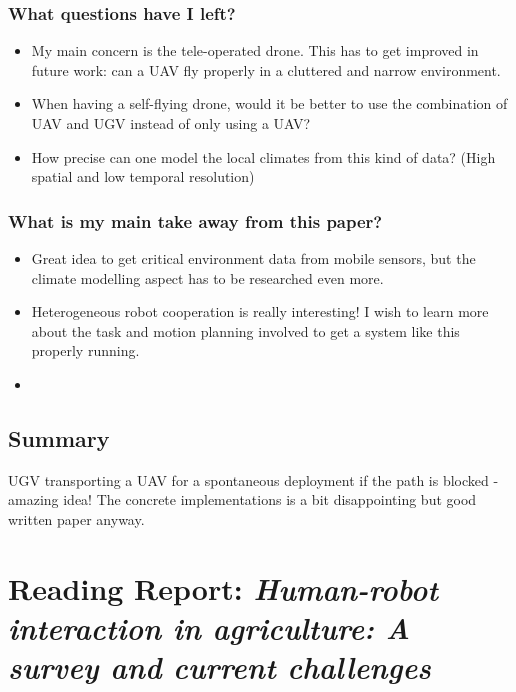     \subsubsection*{What questions have I left?}
    \begin{itemize}
        \item My main concern is the tele-operated drone. This has to get improved in future work: can a UAV fly properly in a cluttered and narrow environment.
        \item When having a self-flying drone, would it be better to use the combination of UAV and UGV instead of only using a UAV?
        \item How precise can one model the local climates from this kind of data? (High spatial and low temporal resolution)
    \end{itemize}
    \subsubsection*{What is my main take away from this paper?}
    \begin{itemize}
        \item Great idea to get critical environment data from mobile sensors, but the climate modelling aspect has to be researched even more.
        \item Heterogeneous robot cooperation is really interesting! I wish to learn more about the task and motion planning involved to get a system like this properly running.
        \item 
    \end{itemize}
    
    \subsection*{Summary}
    UGV transporting a UAV for a spontaneous deployment if the path is blocked - amazing idea! The concrete implementations is a bit disappointing but good written paper anyway.
    
 
    \newpage
    \section{Reading Report: \emph{Human-robot interaction in agriculture: A survey and current challenges}}
    \label{sec:Vasconez2019}
    \cite{Vasconez2019}
    
